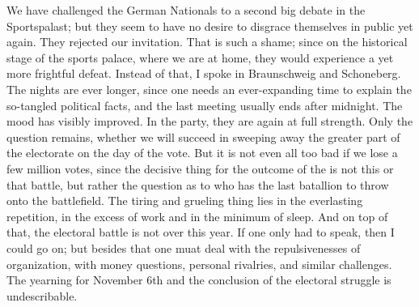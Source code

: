 
We have challenged the German Nationals to a second big debate in the Sportspalast; but they seem to have no desire to disgrace themselves in public yet again. They rejected our invitation. That is such a shame; since on the historical stage of the sports palace, where we are at home, they would experience a yet more frightful defeat. Instead of that, I spoke in Braunschweig and Schoneberg. The nights are ever longer, since one needs an ever-expanding time to explain the so-tangled political facts, and the last meeting usually ends after midnight. The mood has visibly improved. In the party, they are again at full strength. Only the question remains, whether we will succeed in sweeping away the greater part of the electorate on the day of the vote. But it is not even all too bad if we lose a few million votes, since the decisive thing for the outcome of the is not this or that battle, but rather the question as to who has the last batallion to throw onto the battlefield. The tiring and grueling thing lies in the everlasting repetition, in the excess of work and in the minimum of sleep. And on top of that, the electoral battle is not over this year. If one only had to speak, then I could go on; but besides that one muat deal with the repulsivenesses of organization, with money questions, personal rivalries, and similar challenges. The yearning for November 6th and the conclusion of the electoral struggle is undescribable.